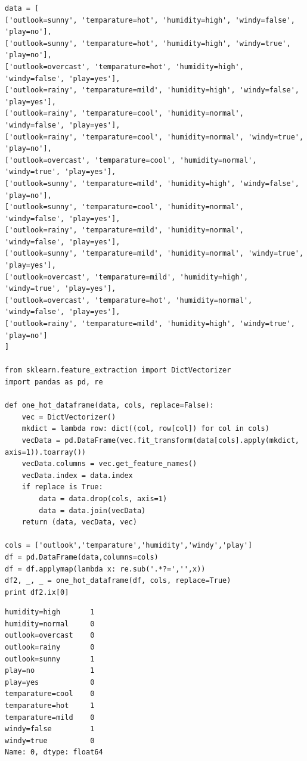 \documentclass[12pt,fleqn]{article}\usepackage{../common}
\begin{document}
\begin{verbatim}
data = [
['outlook=sunny', 'temparature=hot', 'humidity=high', 'windy=false', 'play=no'],
['outlook=sunny', 'temparature=hot', 'humidity=high', 'windy=true', 'play=no'],
['outlook=overcast', 'temparature=hot', 'humidity=high', 'windy=false', 'play=yes'],
['outlook=rainy', 'temparature=mild', 'humidity=high', 'windy=false', 'play=yes'],
['outlook=rainy', 'temparature=cool', 'humidity=normal', 'windy=false', 'play=yes'],
['outlook=rainy', 'temparature=cool', 'humidity=normal', 'windy=true', 'play=no'],
['outlook=overcast', 'temparature=cool', 'humidity=normal', 'windy=true', 'play=yes'],
['outlook=sunny', 'temparature=mild', 'humidity=high', 'windy=false', 'play=no'],
['outlook=sunny', 'temparature=cool', 'humidity=normal', 'windy=false', 'play=yes'],
['outlook=rainy', 'temparature=mild', 'humidity=normal', 'windy=false', 'play=yes'],
['outlook=sunny', 'temparature=mild', 'humidity=normal', 'windy=true', 'play=yes'],
['outlook=overcast', 'temparature=mild', 'humidity=high', 'windy=true', 'play=yes'],
['outlook=overcast', 'temparature=hot', 'humidity=normal', 'windy=false', 'play=yes'],
['outlook=rainy', 'temparature=mild', 'humidity=high', 'windy=true', 'play=no']
]

from sklearn.feature_extraction import DictVectorizer
import pandas as pd, re

def one_hot_dataframe(data, cols, replace=False):
    vec = DictVectorizer()
    mkdict = lambda row: dict((col, row[col]) for col in cols)
    vecData = pd.DataFrame(vec.fit_transform(data[cols].apply(mkdict, axis=1)).toarray())
    vecData.columns = vec.get_feature_names()
    vecData.index = data.index
    if replace is True:
        data = data.drop(cols, axis=1)
        data = data.join(vecData)
    return (data, vecData, vec)

cols = ['outlook','temparature','humidity','windy','play']
df = pd.DataFrame(data,columns=cols)
df = df.applymap(lambda x: re.sub('.*?=','',x))
df2, _, _ = one_hot_dataframe(df, cols, replace=True)
print df2.ix[0]
\end{verbatim}

\begin{verbatim}
humidity=high       1
humidity=normal     0
outlook=overcast    0
outlook=rainy       0
outlook=sunny       1
play=no             1
play=yes            0
temparature=cool    0
temparature=hot     1
temparature=mild    0
windy=false         1
windy=true          0
Name: 0, dtype: float64
\end{verbatim}
\end{document}
